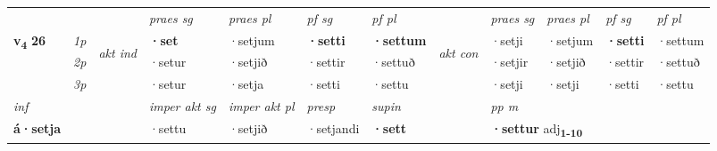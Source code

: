 \begin{longtable}[l]{X>{\footnotesize\itshape}llXXXXlXXXX}
 & &   & \textit{praes sg}  & \textit{praes pl}    & \textit{ pf sg} & \textit{pf pl} & & \textit{praes sg}  & \textit{praes pl}    & \textit{pf sg} & \textit{pf pl }  \\ \cmidrule{4-7} \cmidrule{9-12}
 \multirow{2}{*}{{{\textbf{v{\textsubscript{4}}} \Large{\textbf{26}}}}}  & 1p & \multirow{3}{*}{\begin{turn}{90}\textit{akt ind}\end{turn}} & \textbf{·set} & ·setjum & \textbf{·setti} & \textbf{·settum} & \multirow{3}{*}{\begin{turn}{90}\textit{akt con}\end{turn}} &·setji & ·setjum & \textbf{·setti} & ·settum\\*
 & 2p &  &  ·setur  & ·setjið & ·settir & ·settuð & & ·setjir & ·setjið & ·settir & ·settuð \\*
 & 3p &  & ·setur & ·setja & ·setti & ·settu & & ·setji & ·setji& ·setti & ·settu \\*
\cmidrule{4-7} \cmidrule{9-12}

   {\textit{inf}} & &  & \textit{imper akt sg} & \textit{imper akt pl}   & \textit{presp} & \textit{supin}  && \textit{pp m} \\*
  {\textbf{á\allowbreak ·setja}} & && ·settu  & ·setjið   & ·setjandi &  \textbf{·sett}  && \multicolumn{2}{l}{\textbf{·settur} adj\textbf{\textsubscript{1-10}}} \\*

\midrule


\end{longtable}
